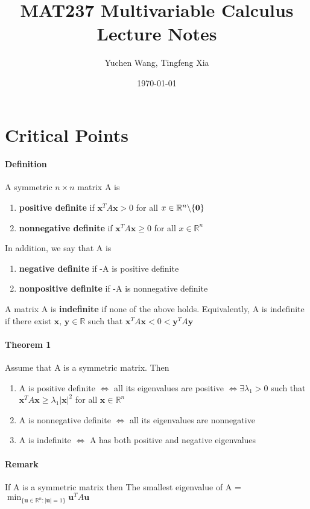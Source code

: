 \documentclass[11pt]{article}
\title{MAT237 Multivariable Calculus \\ Lecture Notes}
\author{Yuchen Wang, Tingfeng Xia}
\date{\today}
\newcommand{\tb}[1]{\textbf{#1}}
\newcommand{\real}[0]{\mathbb{R}}
\begin{document}
    \maketitle
    \tableofcontents
    \newpage
\section{Critical Points}
\paragraph{Definition} A symmetric $n \times n$ matrix A is
\begin{enumerate}
    \item \tb{positive definite} if $\tb{x}^T A \tb{x} > 0$ for all $x \in \real^n \symbol{92} \{\tb{0}\}$
    \item \tb{nonnegative definite} if $\tb{x}^T A \tb{x} \geq 0$ for all $x \in \real^n$
\end{enumerate}
In addition, we say that A is
\begin{enumerate}
    \item \tb{negative definite} if -A is positive definite
    \item \tb{nonpositive definite} if -A is nonnegative definite
\end{enumerate}
A matrix A is \tb{indefinite} if none of the above holds. Equivalently, A is indefinite if there exist $\tb{x, y}\in \real$ such that $\tb{x}^TA\tb{x} < 0 < \tb{y}^TA\tb{y}$
\paragraph{Theorem 1} Assume that A is a symmetric matrix. Then \newline
\begin{enumerate}
    \item A is positive definite $\iff$ all its eigenvalues are positive \newline
$\iff \exists \lambda_1 > 0$ such that $\tb{x}^TA\tb{x} \geq \lambda_1|\tb{x}|^2$ for all $\tb{x} \in \real^n $
    \item A is nonnegative definite $\iff$ all its eigenvalues are nonnegative \newline
    \item A is indefinite $\iff$ A has both positive and negative eigenvalues
\end{enumerate}
\paragraph{Remark} If A is a symmetric matrix then \newline
The smallest eigenvalue of A = $\min_{\{\tb{u}\in \real^n: |\tb{u}| = 1\}} \tb{u}^TA\tb{u}$
\end{document}
